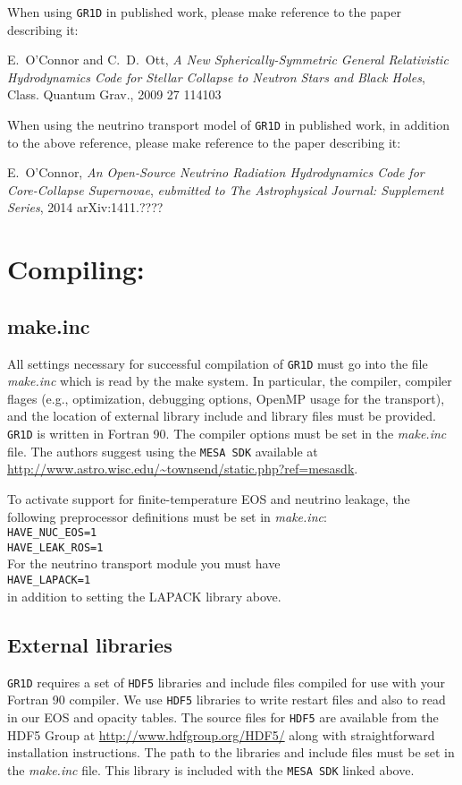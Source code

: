 \documentclass[10pt,nofootinbib]{article}
\newcommand{\code}[1]{\texttt{#1}}
\begin{document}
When using \code{GR1D} in published work, please make reference
to the paper describing it:

\hspace{2cm}\parbox{12cm}{E.\ O'Connor and C.\ D.\ Ott, \emph{A New Spherically-Symmetric
General Relativistic Hydrodynamics Code for Stellar Collapse to Neutron
Stars and Black Holes}, Class. Quantum Grav., 2009 27 114103}

When using the neutrino transport model of \code{GR1D} in published
work, in addition to the above reference, please make reference to
the paper describing it:

\hspace{2cm}\parbox{12cm}{E.\ O'Connor, \emph{An Open-Source Neutrino
    Radiation Hydrodynamics Code for Core-Collapse Supernovae},
  \emph{eubmitted to The Astrophysical Journal: Supplement Series},
  2014 arXiv:1411.????}

\section{Compiling:}
\subsection{make.inc}
All settings necessary for successful compilation of \code{GR1D} must
go into the file {\emph{make.inc}} which is read by the make
system. In particular, the compiler, compiler flages (e.g.,
optimization, debugging options, OpenMP usage for the transport), and
the location of external library include and library files must be
provided. \code{GR1D} is written in Fortran 90.  The compiler options
must be set in the {\it make.inc} file. The authors suggest using the
\code{MESA SDK} available at
\url{http://www.astro.wisc.edu/~townsend/static.php?ref=mesasdk}.

To activate support for finite-temperature EOS and neutrino leakage,
the following preprocessor definitions must be set in \emph{make.inc}:\\
{\tt HAVE\_NUC\_EOS=1}\\
{\tt HAVE\_LEAK\_ROS=1}\\
For the neutrino transport module you must have\\
{\tt HAVE\_LAPACK=1}\\
in addition to setting the LAPACK library above.

\subsection{External libraries}
\code{GR1D} requires a set of \code{HDF5} libraries and include files
compiled for use with your Fortran 90 compiler.  We use \code{HDF5}
libraries to write restart files and also to read in our EOS and
opacity tables.  The source files for \code{HDF5} are available from
the HDF5 Group at \url{http://www.hdfgroup.org/HDF5/} along with
straightforward installation instructions.  The path to the libraries
and include files must be set in the {\it make.inc} file.  This
library is included with the \code{MESA SDK} linked above.
\end{document}
